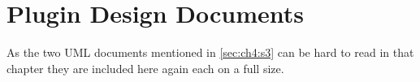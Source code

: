 \chapter{Plugin Design Documents}
\label{chap:appendix:design_docs}
As the two \gls{UML}  documents mentioned in \cref{sec:ch4:s3} can be hard to read in that chapter they are included here again each on a full size.


